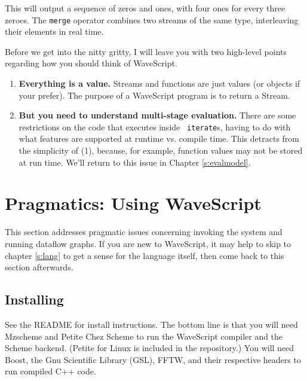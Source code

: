 \documentclass[twocolumn]{report}
\newcommand{\cde}{\tt}
\newcommand{\ws}{WaveScript}
\begin{document}
This will output a sequence of zeros and ones, with four ones for
every three zeroes.  The {\cde merge} operator combines two streams of
the same type, interleaving their elements in real time.

Before we get into the nitty gritty, 
I will leave you with two high-level points regarding how you should
think of WaveScript.

\begin{center}
\begin{enumerate}
   \item {\bf Everything is a value.}  Streams and functions are just
   values (or objects if your prefer).  The purpose of a WaveScript
   program is to return a Stream.

   \item {\bf But you need to understand multi-stage evaluation.}
   There are some restrictions on the code that executes inside {\tt
   iterate}s, having to do with what features are supported at runtime
   vs. compile time.  This detracts from the simplicity of (1),
   because, for example, function values may not be stored at run time.
   We'll return to this issue in Chapter \ref{s:evalmodel}.
\end{enumerate}
\end{center}


\section{Pragmatics: Using WaveScript}


This section addresses pragmatic issues concerning invoking
the system and running dataflow graphs.  If you are new to WaveScript,
it may help to skip to chapter \ref{s:lang} to get a sense for the
language itself, then come back to this section afterwards.

\subsection*{Installing}

See the README for install instructions.  The bottom line is that you
will need Mzscheme and Petite Chez Scheme to run the WaveScript
compiler and the Scheme backend.  (Petite for Linux is included in the
repository.)  You will need Boost, the Gnu Scientific Library (GSL),
FFTW, and their respective headers to run compiled C++ code.
\end{document}

